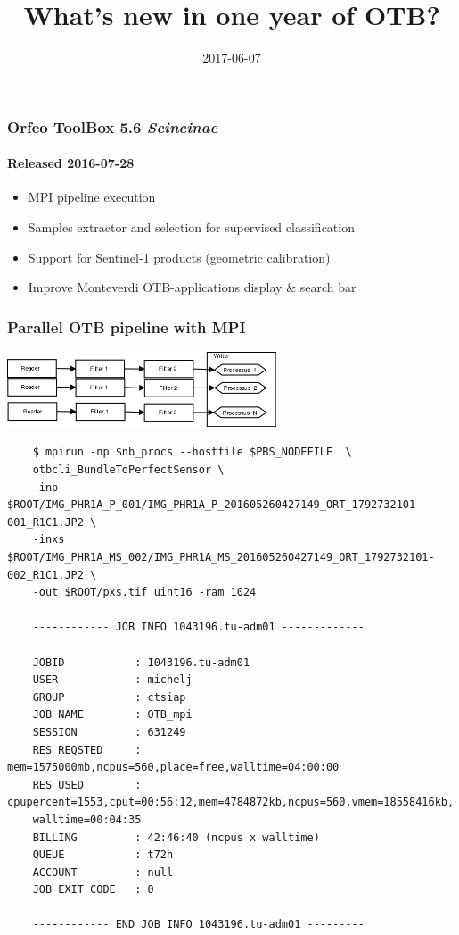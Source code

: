 \documentclass[8pt]{beamer}
\title{What's new in one year of OTB?}
\author{}
\date{2017-06-07}
\begin{document}
\begin{frame}
\titlepage
\end{frame}

\begin{frame}
  \frametitle{Orfeo ToolBox 5.6 \textit{Scincinae}}
  \framesubtitle{Released 2016-07-28}

\begin{itemize}
\item MPI pipeline execution
\item Samples extractor and selection for supervised classification
\item Support for Sentinel-1 products (geometric calibration)
\item Improve Monteverdi OTB-applications display \& search bar
\end{itemize}

\end{frame}

\begin{frame}[fragile]
\frametitle{Parallel OTB pipeline with MPI}
  \begin{center}
  \vspace{-0.5cm}
  \includegraphics[width=0.6\textwidth]{images/mpi.png}
  \begin{scriptsize}
\begin{verbatim}
    $ mpirun -np $nb_procs --hostfile $PBS_NODEFILE  \
    otbcli_BundleToPerfectSensor \
    -inp $ROOT/IMG_PHR1A_P_001/IMG_PHR1A_P_201605260427149_ORT_1792732101-001_R1C1.JP2 \
    -inxs $ROOT/IMG_PHR1A_MS_002/IMG_PHR1A_MS_201605260427149_ORT_1792732101-002_R1C1.JP2 \
    -out $ROOT/pxs.tif uint16 -ram 1024

    ------------ JOB INFO 1043196.tu-adm01 -------------

    JOBID           : 1043196.tu-adm01
    USER            : michelj
    GROUP           : ctsiap
    JOB NAME        : OTB_mpi
    SESSION         : 631249
    RES REQSTED     : mem=1575000mb,ncpus=560,place=free,walltime=04:00:00
    RES USED        : cpupercent=1553,cput=00:56:12,mem=4784872kb,ncpus=560,vmem=18558416kb,
    walltime=00:04:35
    BILLING         : 42:46:40 (ncpus x walltime)
    QUEUE           : t72h
    ACCOUNT         : null
    JOB EXIT CODE   : 0

    ------------ END JOB INFO 1043196.tu-adm01 ---------
\end{verbatim}
\end{scriptsize}
\end{center}
\end{frame}
\end{document}
